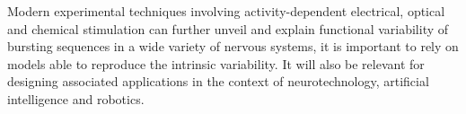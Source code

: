 Modern experimental techniques involving activity-dependent electrical, optical and chemical stimulation can further unveil and explain functional variability of bursting sequences in a wide variety of nervous systems, it is important to rely on models able to reproduce the intrinsic variability. It will also be relevant for designing associated applications in the context of neurotechnology, artificial intelligence and robotics.  
%


